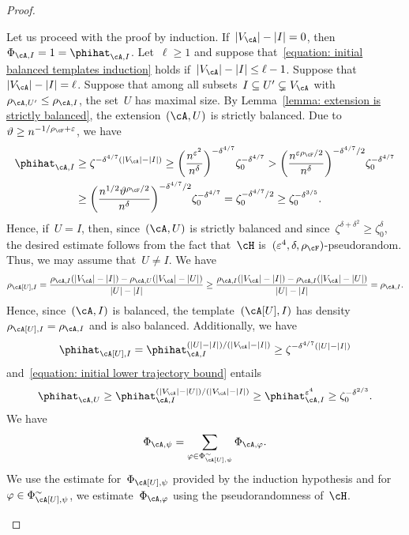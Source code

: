 \documentclass[11pt]{amsart}
\newcommand{\eps}{\varepsilon}
\DeclarePairedDelimiter{\paren}{\lparen}{\rparen}
\DeclarePairedDelimiter{\abs}{\lvert}{\rvert}
\renewcommand{\theta}{\vartheta}
\def\phi{\varphi}
\theoremstyle{definition}
\numberwithin{equation}{section}
\begin{document}
\begin{proof}
\begin{enumerate}[label=\textup{(\roman*)}, topsep=0pt, wide]
			Let us proceed with the proof by induction.
			If~$\abs{V_\cA}-\abs{I}=0$, then~$\Phi_{\cA,I}=1=\phihat_{\cA,I}$.
			Let~$\ell\geq 1$ and suppose that~\eqref{equation: initial balanced templates induction} holds if~$\abs{V_\cA}-\abs{I}\leq \ell-1$.
			Suppose that~$\abs{V_\cA}-\abs{I}=\ell$.
			Suppose that among all subsets~$I\subseteq U'\subsetneq V_\cA$ with~$\rho_{\cA,U'}\leq \rho_{\cA,I}$, the set~$U$ has maximal size.
			By Lemma~\ref{lemma: extension is strictly balanced}, the extension~$(\cA,U)$ is strictly balanced.
			Due to~$\theta\geq n^{-1/\rho_\cF+\eps}$, we have
			\begin{equation}\label{equation: initial lower trajectory bound}
				\begin{aligned}
					\phihat_{\cA,I}
					&\geq \zeta^{-\delta^{4/7}(\abs{V_\cA}-\abs{I})}
					\geq\paren[\bigg]{\frac{n^{\eps^2}}{n^\delta}}^{-\delta^{4/7}}\zeta_0^{-\delta^{4/7}}
					> \paren[\bigg]{\frac{n^{\eps\rho_\cF/2}}{n^{\delta}}}^{-\delta^{4/7}/2}\zeta_0^{-\delta^{4/7}}\\
					&\geq \paren[\bigg]{\frac{n^{1/2}\theta^{\rho_\cF/2}}{n^\delta}}^{-\delta^{4/7}/2}\zeta_0^{-\delta^{4/7}}
					=\zeta_0^{-\delta^{4/7}/2}
					\geq\zeta_0^{-\delta^{3/5}}.
				\end{aligned}
			\end{equation}
			Hence, if~$U=I$, then, since~$(\cA,U)$ is strictly balanced and since~$\zeta^{\delta+\delta^2}\geq \zeta_0^\delta$, the desired estimate follows from the fact that~$\cH$ is~$(\eps^4,\delta,\rho_\cF)$-pseudorandom.
			Thus, we may assume that~$U\neq I$.
			We have
			\begin{equation*}
				\rho_{\cA[U],I}
				=\frac{\rho_{\cA,I}(\abs{V_\cA}-\abs{I})-\rho_{\cA,U}(\abs{V_\cA}-\abs{U})}{\abs{U}-\abs{I}}
				\geq \frac{\rho_{\cA,I}(\abs{V_\cA}-\abs{I})-\rho_{\cA,I}(\abs{V_\cA}-\abs{U})}{\abs{U}-\abs{I}}
				=\rho_{\cA,I}.
			\end{equation*}
			Hence, since~$(\cA,I)$ is balanced, the template~$(\cA[U],I)$ has density~$\rho_{\cA[U],I}=\rho_{\cA,I}$ and is also balanced.
			Additionally, we have
			\begin{equation*}
				\phihat_{\cA[U],I}
				=\phihat_{\cA,I}^{(\abs{U}-\abs{I})/(\abs{V_\cA}-\abs{I})}
				\geq \zeta^{-\delta^{4/7}(\abs{U}-\abs{I})}
			\end{equation*}
			and~\eqref{equation: initial lower trajectory bound} entails
			\begin{equation*}
				\phihat_{\cA,U}
				\geq \phihat_{\cA,I}^{(\abs{V_\cA}-\abs{U})/(\abs{V_\cA}-\abs{I})}
				\geq \phihat_{\cA,I}^{\eps^4}
				\geq 	\zeta_0^{-\delta^{2/3}}.
			\end{equation*}
			We have
			\begin{equation}\label{equation: initial balanced templates split}
				\Phi_{\cA,\psi}=\sum_{\phi\in\Phi_{\cA[U],\psi}^\sim} \Phi_{\cA,\phi}.
			\end{equation}
			We use the estimate for~$\Phi_{\cA[U],\psi}$ provided by the induction hypothesis and for~$\phi\in\Phi_{\cA[U],\psi}^\sim$, we estimate~$\Phi_{\cA,\phi}$ using the pseudorandomness of~$\cH$.
			

\end{enumerate}
\end{proof}
\end{document}
